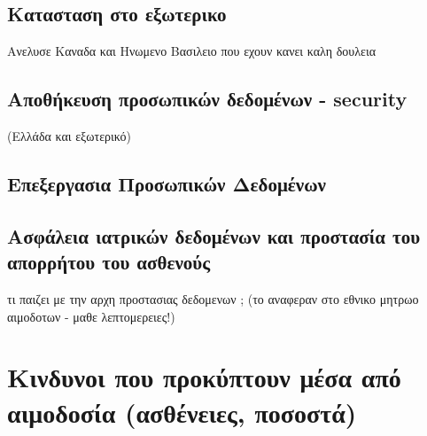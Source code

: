 	\subsection{Κατασταση στο εξωτερικο}
		Ανελυσε Καναδα και Ηνωμενο Βασιλειο που εχουν κανει καλη δουλεια
	\subsection{Αποθήκευση προσωπικών δεδομένων - security}
		(Ελλάδα και εξωτερικό)
	\subsection{Επεξεργασια Προσωπικών Δεδομένων}
	\subsection{Ασφάλεια ιατρικών δεδομένων και προστασία του απορρήτου του
ασθενούς}
		τι παιζει με την αρχη προστασιας δεδομενων ; (το αναφεραν στο εθνικο μητρωο αιμοδοτων - μαθε λεπτομερειες!)

\section{Κινδυνοι που προκύπτουν μέσα από αιμοδοσία (ασθένειες, ποσοστά)}
